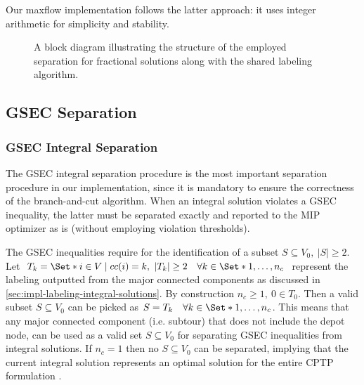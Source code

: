Our maxflow implementation follows the latter approach: it uses integer arithmetic
for simplicity and stability.

\begin{figure}[ht]
	\centering
	\caption{
		A block diagram illustrating the structure
		of the employed separation for fractional solutions along with the shared labeling algorithm.
	}
	\label{fig:fractional-separation-block-diagram}
\end{figure}

\subsection{GSEC Separation}
\label{sec:impl-gsec-separation}

\subsubsection{GSEC Integral Separation}
\label{sec:impl-gsec-integral-separation}

The GSEC integral separation procedure is the most important
separation procedure in our implementation,
since it is mandatory to ensure the correctness of the branch-and-cut algorithm.
When an integral solution violates a GSEC inequality,
the latter must be separated exactly and reported to the MIP optimizer as is
(without employing violation thresholds).

The GSEC inequalities require for the identification of a subset $S \subseteq V_0,\ |S| \ge 2$.
Let $T_k  = \Set*{i \in V \mid cc(i) = k},\ |T_k| \ge 2 \quad \forall k \in \Set*{1, \dots, n_c}$
represent the labeling outputted from the major connected components
as discussed in \cref{sec:impl-labeling-integral-solutions}.
By construction $n_c \ge 1,\ 0 \in T_0$.
Then a valid subset $S \subseteq V_0$ can be picked as $S = T_k \quad \forall k \in \Set*{1, \dots, n_c}$.
This means that
any major connected component (i.e. subtour) that does not include the depot node,
can be used as a valid set $S \subseteq V_0$ for separating GSEC inequalities from integral solutions.
If $n_c = 1$ then no $S \subseteq V_0$ can be separated,
implying that the current integral solution represents an optimal solution for the entire CPTP formulation
.

